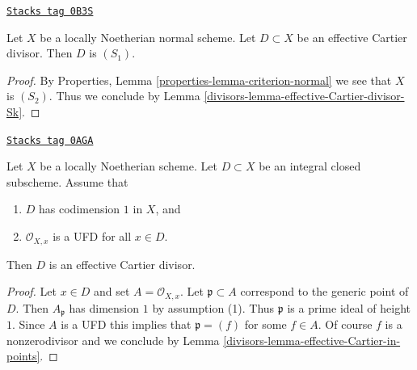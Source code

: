 \begin{lemma}
\label{divisors-lemma-normal-effective-Cartier-divisor-S1}
\href{https://stacks.math.columbia.edu/tag/0B3S}{\texttt{Stacks tag 0B3S}}

Let $X$ be a locally Noetherian normal scheme. Let $D \subset X$ be an
effective Cartier divisor. Then $D$ is $(S_1)$.
\end{lemma}

\begin{proof}

By Properties, Lemma \ref{properties-lemma-criterion-normal}
we see that $X$ is $(S_2)$. Thus we conclude by
Lemma \ref{divisors-lemma-effective-Cartier-divisor-Sk}.
\end{proof}

\begin{lemma}
\label{divisors-lemma-weil-divisor-is-cartier-UFD}
\href{https://stacks.math.columbia.edu/tag/0AGA}{\texttt{Stacks tag 0AGA}}

Let $X$ be a locally Noetherian scheme. Let $D \subset X$ be an integral
closed subscheme. Assume that
\begin{enumerate}
\item $D$ has codimension $1$ in $X$, and
\item $\mathcal{O}_{X, x}$ is a UFD for all $x \in D$.
\end{enumerate}
Then $D$ is an effective Cartier divisor.
\end{lemma}

\begin{proof}

Let $x \in D$ and set $A = \mathcal{O}_{X, x}$. Let $\mathfrak p \subset A$
correspond to the generic point of $D$. Then $A_\mathfrak p$ has dimension
$1$ by assumption (1). Thus $\mathfrak p$ is a prime ideal of height $1$.
Since $A$ is a UFD this implies that $\mathfrak p = (f)$ for some $f \in A$.
Of course $f$ is a nonzerodivisor and we conclude by
Lemma \ref{divisors-lemma-effective-Cartier-in-points}.
\end{proof}

